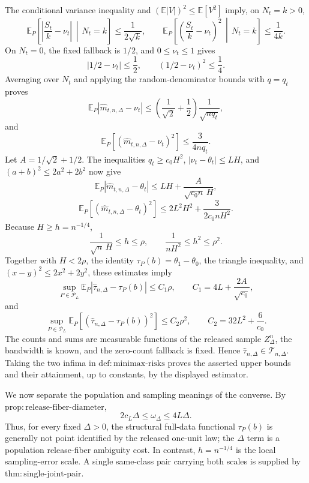 The conditional variance inequality and \((\mathbb E|V|)^2\leq\mathbb E[V^2]\) imply, on \(N_t=k>0\),
\[
 \mathbb E_P\!\left[\left|\frac{S_t}{k}-\nu_t\right|\,\middle|\,N_t=k\right]
 \leq\frac1{2\sqrt k},
 \qquad
 \mathbb E_P\!\left[\left(\frac{S_t}{k}-\nu_t\right)^2\,\middle|\,N_t=k\right]
 \leq\frac1{4k}.
\]
On \(N_t=0\), the fixed fallback is \(1/2\), and \(0\leq\nu_t\leq1\) gives
\[
 |1/2-\nu_t|\leq\frac12,
 \qquad (1/2-\nu_t)^2\leq\frac14.
\]
Averaging over \(N_t\) and applying the random-denominator bounds with \(q=q_t\) proves
\[
 \mathbb E_P|\widehat m_{t,n,\Delta}-\nu_t|
 \leq\left(\frac1{\sqrt2}+\frac12\right)\frac1{\sqrt{nq_t}},
\]
and
\[
 \mathbb E_P[(\widehat m_{t,n,\Delta}-\nu_t)^2]
 \leq\frac3{4nq_t}.
\]
Let \(A=1/\sqrt2+1/2\).  The inequalities \(q_t\geq c_0H^2\), \(|\nu_t-\theta_t|\leq LH\), and \((a+b)^2\leq2a^2+2b^2\) now give
\[
 \mathbb E_P|\widehat m_{t,n,\Delta}-\theta_t|
 \leq LH+\frac{A}{\sqrt{c_0n}\,H},
\]
\[
 \mathbb E_P[(\widehat m_{t,n,\Delta}-\theta_t)^2]
 \leq2L^2H^2+\frac3{2c_0nH^2}.
\]
Because \(H\geq h=n^{-1/4}\),
\[
 \frac1{\sqrt n\,H}\leq h\leq\rho,
 \qquad
 \frac1{nH^2}\leq h^2\leq\rho^2.
\]
Together with \(H<2\rho\), the identity \(\tau_P(b)=\theta_1-\theta_0\), the triangle inequality, and \((x-y)^2\leq2x^2+2y^2\), these estimates imply
\[
 \sup_{P\in\mathcal P_L}
 \mathbb E_P|\widehat\tau_{n,\Delta}-\tau_P(b)|
 \leq C_1\rho,
 \qquad
 C_1=4L+\frac{2A}{\sqrt{c_0}},
\]
and
\[
 \sup_{P\in\mathcal P_L}
 \mathbb E_P[(\widehat\tau_{n,\Delta}-\tau_P(b))^2]
 \leq C_2\rho^2,
 \qquad
 C_2=32L^2+\frac6{c_0}.
\]
The counts and sums are measurable functions of the released sample \(Z_\Delta^n\), the bandwidth is known, and the zero-count fallback is fixed.  Hence \(\widehat\tau_{n,\Delta}\in\mathcal T_{n,\Delta}\).  Taking the two infima in \(\mathrm{def:minimax\text{-}risks}\) proves the asserted upper bounds and their attainment, up to constants, by the displayed estimator.

We now separate the population and sampling meanings of the converse.  By \(\mathrm{prop:release\text{-}fiber\text{-}diameter}\),
\[
 2c_L\Delta\leq\omega_\Delta\leq4L\Delta.
\]
Thus, for every fixed \(\Delta>0\), the structural full-data functional \(\tau_P(b)\) is generally not point identified by the released one-unit law; the \(\Delta\) term is a population release-fiber ambiguity cost.  In contrast, \(h=n^{-1/4}\) is the local sampling-error scale.  A single same-class pair carrying both scales is supplied by \(\mathrm{thm:single\text{-}joint\text{-}pair}\).

